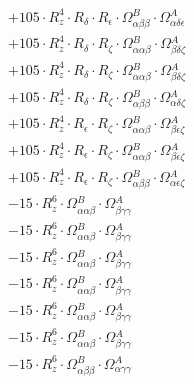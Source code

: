 \documentclass{article}
\begin{document}
\begin{subequations}
\begin{gather}
\begin{array}{c}
 \\[0.2em] 		 + 105 \cdot R_{z}^{4} \cdot R_{\delta{}} \cdot R_{\epsilon{}} \cdot \Omega{}^{B}_{\alpha{}\beta{}\beta{}} \cdot \Omega{}^{A}_{\alpha{}\delta{}\epsilon{}} 
 \\[0.2em] 		 + 105 \cdot R_{z}^{4} \cdot R_{\delta{}} \cdot R_{\zeta{}} \cdot \Omega{}^{B}_{\alpha{}\alpha{}\beta{}} \cdot \Omega{}^{A}_{\beta{}\delta{}\zeta{}} 
 \\[0.2em] 		 + 105 \cdot R_{z}^{4} \cdot R_{\delta{}} \cdot R_{\zeta{}} \cdot \Omega{}^{B}_{\alpha{}\alpha{}\beta{}} \cdot \Omega{}^{A}_{\beta{}\delta{}\zeta{}} 
 \\[0.2em] 		 + 105 \cdot R_{z}^{4} \cdot R_{\delta{}} \cdot R_{\zeta{}} \cdot \Omega{}^{B}_{\alpha{}\beta{}\beta{}} \cdot \Omega{}^{A}_{\alpha{}\delta{}\zeta{}} 
 \\[0.2em] 		 + 105 \cdot R_{z}^{4} \cdot R_{\epsilon{}} \cdot R_{\zeta{}} \cdot \Omega{}^{B}_{\alpha{}\alpha{}\beta{}} \cdot \Omega{}^{A}_{\beta{}\epsilon{}\zeta{}} 
 \\[0.2em] 		 + 105 \cdot R_{z}^{4} \cdot R_{\epsilon{}} \cdot R_{\zeta{}} \cdot \Omega{}^{B}_{\alpha{}\alpha{}\beta{}} \cdot \Omega{}^{A}_{\beta{}\epsilon{}\zeta{}} 
 \\[0.2em] 		 + 105 \cdot R_{z}^{4} \cdot R_{\epsilon{}} \cdot R_{\zeta{}} \cdot \Omega{}^{B}_{\alpha{}\beta{}\beta{}} \cdot \Omega{}^{A}_{\alpha{}\epsilon{}\zeta{}} 
 \\[0.2em] 		 - 15 \cdot R_{z}^{6} \cdot \Omega{}^{B}_{\alpha{}\alpha{}\beta{}} \cdot \Omega{}^{A}_{\beta{}\gamma{}\gamma{}} 
 \\[0.2em] 		 - 15 \cdot R_{z}^{6} \cdot \Omega{}^{B}_{\alpha{}\alpha{}\beta{}} \cdot \Omega{}^{A}_{\beta{}\gamma{}\gamma{}} 
 \\[0.2em] 		 - 15 \cdot R_{z}^{6} \cdot \Omega{}^{B}_{\alpha{}\alpha{}\beta{}} \cdot \Omega{}^{A}_{\beta{}\gamma{}\gamma{}} 
 \\[0.2em] 		 - 15 \cdot R_{z}^{6} \cdot \Omega{}^{B}_{\alpha{}\alpha{}\beta{}} \cdot \Omega{}^{A}_{\beta{}\gamma{}\gamma{}} 
 \\[0.2em] 		 - 15 \cdot R_{z}^{6} \cdot \Omega{}^{B}_{\alpha{}\alpha{}\beta{}} \cdot \Omega{}^{A}_{\beta{}\gamma{}\gamma{}} 
 \\[0.2em] 		 - 15 \cdot R_{z}^{6} \cdot \Omega{}^{B}_{\alpha{}\alpha{}\beta{}} \cdot \Omega{}^{A}_{\beta{}\gamma{}\gamma{}} 
 \\[0.2em] 		 - 15 \cdot R_{z}^{6} \cdot \Omega{}^{B}_{\alpha{}\beta{}\beta{}} \cdot \Omega{}^{A}_{\alpha{}\gamma{}\gamma{}} 

\end{array}
\end{gather}
\end{subequations}
\end{document}

